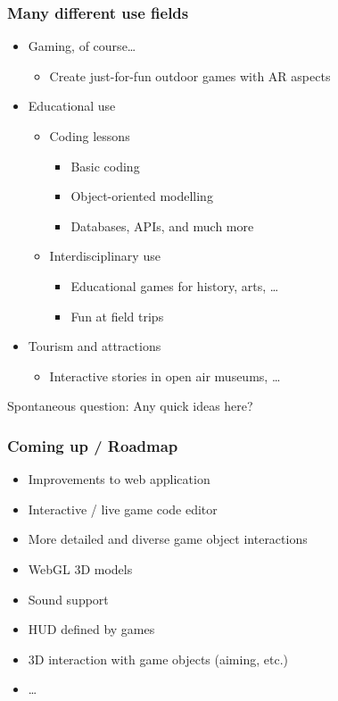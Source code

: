 \documentclass[aspectratio=43]{beamer}
\begin{document}
 \begin{frame}
  \frametitle{Many different use fields}

  \begin{itemize}
   \item{Gaming, of course…
    \begin{itemize}
     \item{Create just-for-fun outdoor games with AR aspects}
    \end{itemize}
   }
   \item{Educational use
    \begin{itemize}
     \item{Coding lessons
      \begin{itemize}
       \item{Basic coding}
       \item{Object-oriented modelling}
       \item{Databases, APIs, and much more}
      \end{itemize}
     }
     \item{Interdisciplinary use
      \begin{itemize}
       \item{Educational games for history, arts, …}
       \item{Fun at field trips}
      \end{itemize}
     }
    \end{itemize}
   }
   \item{Tourism and attractions
    \begin{itemize}
     \item{Interactive stories in open air museums, …}
    \end{itemize}
   }
  \end{itemize}
 \end{frame}

 \begin{frame}
  \Large
  Spontaneous question: Any quick ideas here?
 \end{frame}

 \begin{frame}
  \frametitle{Coming up / Roadmap}

  \begin{itemize}
   \item{Improvements to web application}
   \item{Interactive / live game code editor}
   \item{More detailed and diverse game object interactions}
   \item{WebGL 3D models}
   \item{Sound support}
   \item{HUD defined by games}
   \item{3D interaction with game objects (aiming, etc.)}
   \item{…}
  \end{itemize}
 \end{frame}
\end{document}
